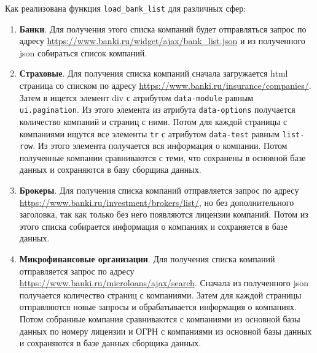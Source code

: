 \documentclass{article}
\begin{document}
Как реализована функция \texttt{load\_bank\_list} для различных сфер:
\begin{enumerate}
\item \textbf{Банки}. Для получения этого списка компаний будет отправляться запрос по адресу \url{https://www.banki.ru/widget/ajax/bank\_list.json} и из полученного json собираться список компаний.
\item \textbf{Страховые}. Для получения списка компаний сначала загружается html страница со списком по адресу \url{https://www.banki.ru/insurance/companies/}. Затем в ищется элемент div с атрибутом \texttt{data-module} равным \texttt{ui.pagination}. Из этого элемента из атрибута \texttt{data-options} получается количество компаний и страниц с ними. Потом для каждой страницы с компаниями ищутся все элементы \texttt{tr} с атрибутом \texttt{data-test} равным \texttt{list-row}. Из этого элемента получается вся информация о компании. Потом полученные компании сравниваются с теми, что сохранены в основной базе данных и сохраняются в базу сборщика данных.
\item \textbf{Брокеры}. Для получения списка компаний отправляется запрос по адресу \url{https://www.banki.ru/investment/brokers/list/}, но без дополнительного заголовка, так как только без него появляются лицензии компаний. Потом из этого списка собирается информация о компаниях и сохраняется в базе данных.
\item \textbf{Микрофинансовые организации}. Для получения списка компаний отправляется запрос по адресу \url{https://www.banki.ru/microloans/ajax/search}. Сначала из полученного json получается количество страниц с компаниями. Затем для каждой страницы отправляются новые запросы и обрабатывается информация о компаниях. Потом собранные компания сравниваются с компаниями из основной базы данных по номеру лицензии и ОГРН с компаниями из основной базы данных и сохраняются в базе данных сборщика данных.
\end{enumerate}
\end{document}
